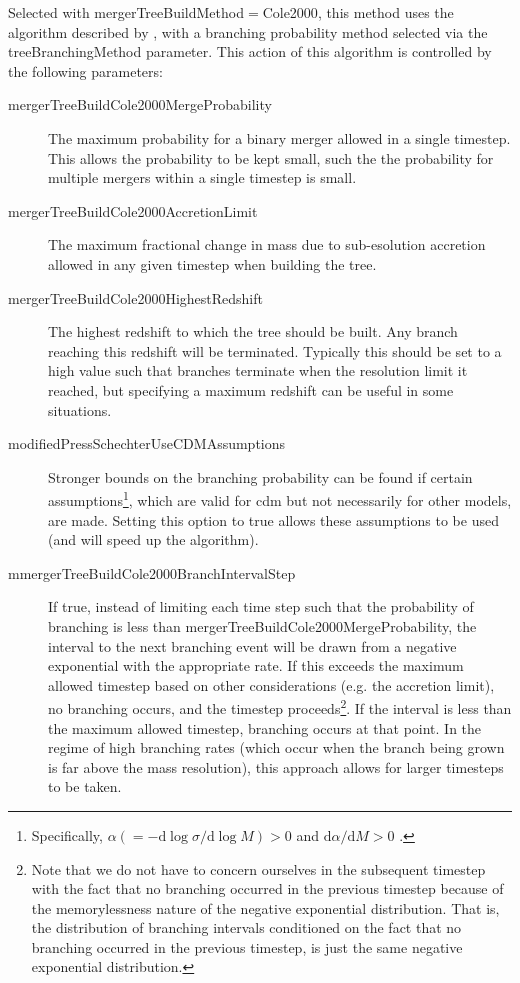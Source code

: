 Selected with {\normalfont \ttfamily mergerTreeBuildMethod}$=${\normalfont \ttfamily Cole2000}, this method uses the algorithm described by \cite{cole_hierarchical_2000}, with a branching probability method selected via the {\normalfont \ttfamily treeBranchingMethod} parameter. This action of this algorithm is controlled by the following parameters:
\begin{description}
 \item [{\normalfont \ttfamily mergerTreeBuildCole2000MergeProbability}] The maximum probability for a binary merger allowed in a single timestep. This allows the probability to be kept small, such the the probability for multiple mergers within a single timestep is small.
 \item [{\normalfont \ttfamily mergerTreeBuildCole2000AccretionLimit}] The maximum fractional change in mass due to sub-esolution accretion allowed in any given timestep when building the tree.
 \item [{\normalfont \ttfamily mergerTreeBuildCole2000HighestRedshift}] The highest redshift to which the tree should be built. Any branch reaching this redshift will be terminated. Typically this should be set to a high value such that branches terminate when the resolution limit it reached, but specifying a maximum redshift can be useful in some situations.
 \item [{\normalfont \ttfamily modifiedPressSchechterUseCDMAssumptions}] Stronger bounds on the branching probability can be found if certain assumptions\footnote{Specifically, $\alpha(=-{\mathrm d}\log \sigma/{\mathrm d}\log M)>0$ and ${\mathrm d}\alpha/{\mathrm d}M>0$ \protect\citep{parkinson_generating_2008}.}, which are valid for \gls{cdm} but not necessarily for other models, are made. Setting this option to {\normalfont \ttfamily true} allows these assumptions to be used (and will speed up the algorithm).
 \item [{\normalfont \ttfamily mmergerTreeBuildCole2000BranchIntervalStep}] If {\normalfont \ttfamily true}, instead of limiting each time step such that the probability of branching is less than {\normalfont \ttfamily mergerTreeBuildCole2000MergeProbability}, the interval to the next branching event will be drawn from a negative exponential with the appropriate rate. If this exceeds the maximum allowed timestep based on other considerations (e.g. the accretion limit), no branching occurs, and the timestep proceeds\footnote{Note that we do not have to concern ourselves in the subsequent timestep with the fact that no branching occurred in the previous timestep because of the memorylessness nature of the negative exponential distribution. That is, the distribution of branching intervals conditioned on the fact that no branching occurred in the previous timestep, is just the same negative exponential distribution.}. If the interval is less than the maximum allowed timestep, branching occurs at that point. In the regime of high branching rates (which occur when the branch being grown is far above the mass resolution), this approach allows for larger timesteps to be taken.
\end{description}
